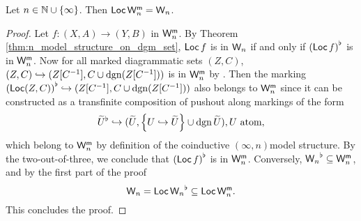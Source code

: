 \begin{prop} \label{prop:loc_preserves_weak_equivalences} 
    Let \( n \in \mathbb{N} \cup \left\{ {\infty} \right\} \).
    Then \( \operatorname{\mathsf{Loc}} \mathsf{W}^{{\mathsf{m}}}_n = \mathsf{W}_n \).
\end{prop}
\begin{proof}
    Let \( f \colon (X, A) \to (Y, B) \) in \( \mathsf{W}^{{\mathsf{m}}}_n \).
    By Theorem \ref{thm:n_model_structure_on_dgm_set}, \( \operatorname{\mathsf{Loc}} f \) is in \( \mathsf{W}_n \) if and only if \( {(\operatorname{\mathsf{Loc}} f)}^{\flat} \) is in \( \mathsf{W}^{{\mathsf{m}}}_n \).
    Now for all marked diagrammatic sets \( (Z, C) \), \( (Z, C) \hookrightarrow (Z[C^{-1}], C \cup \operatorname{dgn} (Z[C^{-1}])) \) is in \( \mathsf{W}^{{\mathsf{m}}}_n \) by \cite[Lemma 4.17]{chanavat2024model}.
    Then the marking \( {(\operatorname{\mathsf{Loc}} (Z, C))}^{\flat} \hookrightarrow (Z[C^{-1}], C \cup \operatorname{dgn} (Z[C^{-1}])) \) also belongs to \( \mathsf{W}^{{\mathsf{m}}}_n \) since it can be constructed as a transfinite composition of pushout along markings of the form
    \begin{equation*}
        {\widetilde{U}}^{\flat} \hookrightarrow (\widetilde{U}, \left\{ {U \hookrightarrow \widetilde{U}} \right\} \cup \operatorname{dgn} \widetilde{U}), U \text{ atom},
    \end{equation*}
    which belong to \( \mathsf{W}^{{\mathsf{m}}}_n \) by definition of the coinductive \( (\infty, n) \)\nbd model structure.
    By the two-out-of-three, we conclude that \( {(\operatorname{\mathsf{Loc}} f)}^{\flat} \) is in \( \mathsf{W}^{{\mathsf{m}}}_n \).
    Conversely, \( {\mathsf{W}_n}^{\flat} \subseteq \mathsf{W}^{{\mathsf{m}}}_n \), and by the first part of the proof
    \begin{equation*}
        \mathsf{W}_n = \operatorname{\mathsf{Loc}} {\mathsf{W}_n}^{\flat} \subseteq \operatorname{\mathsf{Loc}} \mathsf{W}^{{\mathsf{m}}}_n.
    \end{equation*}
    This concludes the proof.
\end{proof}



